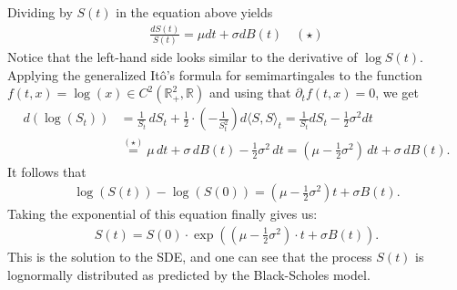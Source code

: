 \documentclass[11pt,a4paper, final]{article}
\begin{document}
Dividing by $S(t)$ in the equation above yields
\begin{align*}\frac{dS(t)}{S(t)}=\mu dt + \sigma dB(t)\quad (\star) \end{align*}
Notice that the left-hand side looks similar to the derivative of $\log{S(t)}$.\\
Applying the generalized Itô's formula for semimartingales to the function $f(t,x)=\log(x)\in C^2(\mathbb{R}_+^2,\mathbb{R})$ and using that $\partial_t f(t,x)=0$, we get 
\begin{align*}
d(\log(S_t))&=\frac{1}{S_t} \, dS_t + \frac{1}{2}\cdot \left(-\frac{1}{S^2_t} \right) d\langle S,S\rangle_t 
= \frac{1}{S_t} dS_t -\frac{1}{2} \sigma^2 dt \\
&\stackrel{(\star)}{=} \mu \, dt + \sigma \, dB(t) -\frac{1}{2} \sigma^2 \, dt
=\left(\mu -\frac{1}{2} \sigma^2\right)\, dt + \sigma \, dB(t).
\end{align*}
It follows that
\begin{align*}\log(S(t))-\log(S(0)) =\left(\mu -\frac{1}{2} \sigma^2\right)t + \sigma B(t).
\end{align*}
Taking the exponential of this equation finally gives us:
\begin{align*}
S(t)=S(0) \cdot \exp\left( \left(\mu - \frac{1}{2}\sigma^2\right)\cdot t + \sigma B(t)\right).
\end{align*}
This is the solution to the SDE, and one can see that the process $S(t)$ is lognormally distributed as predicted by the Black-Scholes model.
\end{document}
